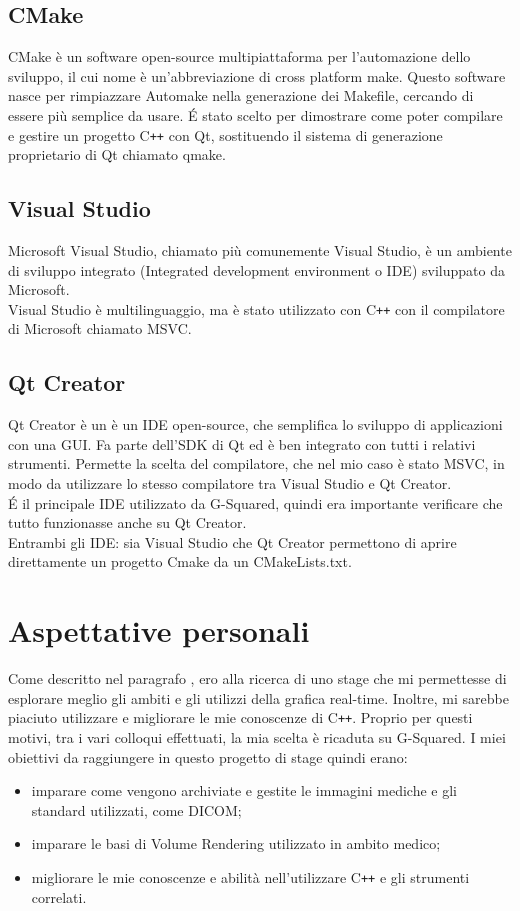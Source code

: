 \subsection{CMake}\label{sec:cmake}
CMake è un software open-source multipiattaforma per l'automazione dello sviluppo, il cui nome è un'abbreviazione di cross platform make. Questo software nasce per rimpiazzare Automake nella generazione dei Makefile, cercando di essere più semplice da usare.
\'E stato scelto per dimostrare come poter compilare e gestire un progetto C\texttt{++} con Qt, sostituendo il sistema di generazione proprietario di Qt chiamato qmake.

\subsection{Visual Studio}\label{sec:visual-studio}
Microsoft Visual Studio, chiamato più comunemente Visual Studio, è un ambiente di sviluppo integrato (Integrated development environment o IDE) sviluppato da Microsoft.
\\
Visual Studio è multilinguaggio, ma è stato utilizzato con C\texttt{++} con il compilatore di Microsoft chiamato MSVC.

\subsection{Qt Creator}\label{sec:qt-creator}
Qt Creator è un è un IDE open-source, che semplifica lo sviluppo di applicazioni con una GUI. Fa parte dell'SDK di Qt ed è ben integrato con tutti i relativi strumenti. Permette la scelta del compilatore, che nel mio caso è stato MSVC, in modo da utilizzare lo stesso compilatore tra Visual Studio e Qt Creator.
\\
\'E il principale IDE utilizzato da G-Squared, quindi era importante verificare che tutto funzionasse anche su Qt Creator.
\\
Entrambi gli IDE: sia Visual Studio che Qt Creator permettono di aprire direttamente un progetto Cmake da un CMakeLists.txt.

\section{Aspettative personali}
Come descritto nel paragrafo , ero alla ricerca di uno stage che mi permettesse di esplorare meglio gli ambiti e gli utilizzi della grafica real-time. Inoltre, mi sarebbe piaciuto utilizzare e migliorare le mie conoscenze di C\texttt{++}. Proprio per questi motivi, tra i vari colloqui effettuati, la mia scelta è ricaduta su G-Squared. I miei obiettivi da raggiungere in questo progetto di stage quindi erano:
\begin{itemize}
\item imparare come vengono archiviate e gestite le immagini mediche e gli standard utilizzati, come DICOM;
\item imparare le basi di Volume Rendering utilizzato in ambito medico;
\item migliorare le mie conoscenze e abilità nell'utilizzare C\texttt{++} e gli strumenti correlati.
\end{itemize}
